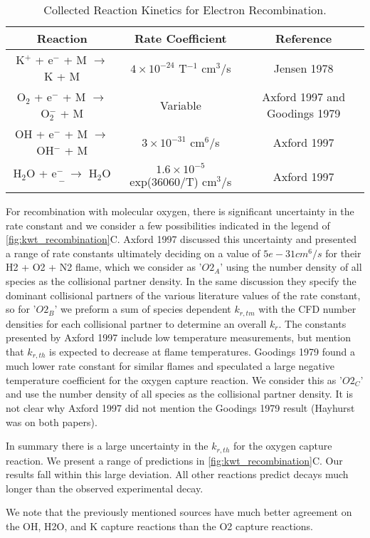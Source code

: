 \begin{table}[h]
\centering
\caption{Collected Reaction Kinetics for Electron Recombination.}
\label{tab:reactions}
\begin{tabular}{|c|c|c|}
\hline
Reaction & Rate Coefficient & Reference \\
\hline
K$^+$ + e$^-$ + M $\rightarrow$ K + M & $4 \times 10^{-24}$ T$^{-1}$ cm$^3$/s & Jensen 1978 \\
\hline
O$_2$ + e$^-$ + M $\rightarrow$ O$_2^-$ + M & Variable & Axford 1997 and Goodings 1979 \\
\hline
OH + e$^-$ + M $\rightarrow$ OH$^-$ + M & $3 \times 10^{-31}$ cm$^6$/s & Axford 1997 \\
\hline
H$_2$O + e$^-$ $\rightarrow$ H$_2$O$^-$ & $1.6 \times 10^{-5}$ exp(36060/T) cm$^3$/s & Axford 1997 \\
\hline
\end{tabular}
\end{table}


For recombination with molecular oxygen, there is significant uncertainty in the rate constant and we consider a few possibilities indicated in the legend of \ref{fig:kwt_recombination}C. Axford 1997 discussed this uncertainty and presented a range of rate constants ultimately deciding on a value of $5e-31 cm^6/s$ for their H2 + O2 + N2 flame, which we consider as '$O2_A$' using the number density of all species as the collisional partner density. In the same discussion they specify the dominant collisional partners of the various literature values of the rate constant, so for '$O2_B$' we preform a sum of species dependent $k_{r,tm}$ with the CFD number densities for each collisional partner to determine an overall $k_r$. The constants presented by Axford 1997 include low temperature measurements, but mention that $k_{r,th}$ is expected to decrease at flame temperatures. Goodings 1979 found a much lower rate constant for similar flames and speculated a large negative temperature coefficient for the oxygen capture reaction. We consider this as '$O2_C$' and use the number density of all species as the collisional partner density. It is not clear why Axford 1997 did not mention the Goodings 1979 result (Hayhurst was on both papers). 

In summary there is a large uncertainty in the $k_{r,th}$ for the oxygen capture reaction. We present a range of predictions in \ref{fig:kwt_recombination}C. Our results fall within this large deviation. All other reactions predict decays much longer than the observed experimental decay. 

We note that the previously mentioned sources have much better agreement on the OH, H2O, and K capture reactions than the O2 capture reactions. 



